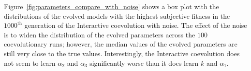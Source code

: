 Figure~\ref{fig:parameters_compare_with_noise} shows a box plot with the distributions of the evolved models with the highest subjective fitness in the $1000^\textrm{th}$ generation of the Interactive coevolution with noise. The effect of the noise is to widen the distribution of the evolved parameters across the $100$ coevolutionary runs; however, the median values of the evolved parameters are still very close to the true values. Interestingly, the Interactive coevolution does not seem to learn $\alpha_2$ and $\alpha_3$ significantly worse than it does learn $k$ and $\alpha_1$. 

%
